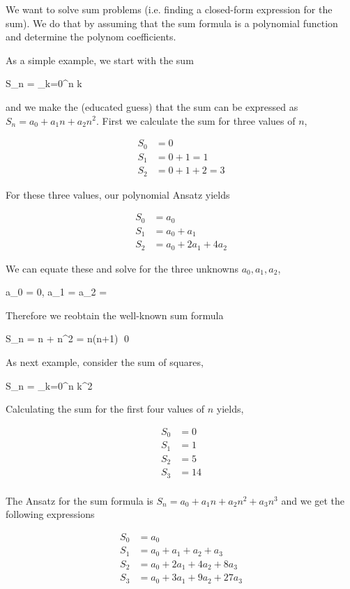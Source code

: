 
We want to solve sum problems (i.e. finding a closed-form expression for the sum). We do that by assuming that the sum formula is a polynomial function and determine the polynom coefficients.

As a simple example, we start with the sum

\bee
S_n = \sum_{k=0}^n k
\eee

and we make the (educated guess) that the sum can be expressed as $S_n = a_0 + a_1 n + a_2 n^2$. First we calculate the sum for three values of $n$,

\begin{align*}
  S_0 &= 0 \\
  S_1 &= 0 + 1 = 1 \\
  S_2 &= 0 + 1 + 2 = 3
\end{align*}

For these three values, our polynomial Ansatz yields

\begin{align*}
  S_0 &= a_0 \\
  S_1 &= a_0 + a_1 \\
  S_2 &= a_0 + 2a_1 + 4a_2
\end{align*}

We can equate these and solve for the three unknowns $a_0, a_1, a_2$,

\bee
a_0 = 0, a_1 = a_2 = 
\eee

Therefore we reobtain the well-known sum formula

\be\label{2022-09-01:eq1}
S_n = n + n^2 = n(n+1) \qed
\ee

As next example, consider the sum of squares,

\bee
S_n = \sum_{k=0}^n k^2
\eee

Calculating the sum for the first four values of $n$ yields,

\begin{align*}
  S_0 &= 0 \\
  S_1 &= 1 \\
  S_2 &= 5 \\
  S_3 &= 14 \\
\end{align*}

The Ansatz for the sum formula is $S_n = a_0 + a_1 n + a_2 n^2 + a_3 n^3$ and we get the following expressions

\begin{align}\label{2022-09-01:eq2}
  S_0 &= a_0 \\
  S_1 &= a_0 + a_1 + a_2 + a_3 \nonumber \\
  S_2 &= a_0 + 2a_1 + 4a_2 + 8a_3 \nonumber \\
  S_3 &= a_0 + 3a_1 + 9a_2 + 27a_3 \nonumber
\end{align}

